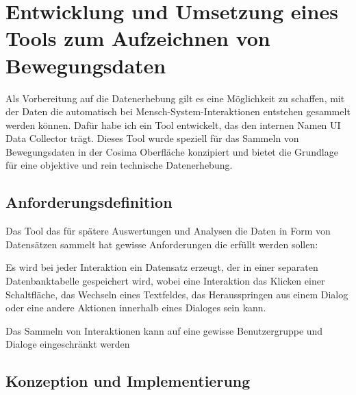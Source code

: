 \section{Entwicklung und Umsetzung eines Tools zum Aufzeichnen von Bewegungsdaten}
Als Vorbereitung auf die Datenerhebung gilt es eine Möglichkeit zu schaffen, mit der Daten die automatisch bei Mensch-System-Interaktionen entstehen gesammelt werden können. Dafür habe ich ein Tool entwickelt, das den internen Namen UI Data Collector trägt. Dieses Tool wurde speziell für das Sammeln von Bewegungsdaten in der Cosima Oberfläche konzipiert und bietet die Grundlage für eine objektive und rein technische Datenerhebung.

\subsection{Anforderungsdefinition}
Das Tool das für spätere Auswertungen und Analysen die Daten in Form von Datensätzen sammelt hat gewisse Anforderungen die erfüllt werden sollen:

\begin{compactitem}
   \item Es wird bei jeder Interaktion ein Datensatz erzeugt, der in einer separaten Datenbanktabelle gespeichert wird, wobei eine Interaktion das Klicken einer Schaltfläche, das Wechseln eines Textfeldes, das Herausspringen aus einem Dialog oder eine andere Aktionen innerhalb eines Dialoges sein kann.
   \item Das Sammeln von Interaktionen kann auf eine gewisse Benutzergruppe und Dialoge eingeschränkt werden
\end{compactitem}


\subsection{Konzeption und Implementierung}

